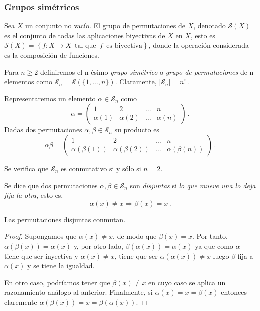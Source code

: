 \subsubsection{Grupos simétricos}

Sea $X$ un conjunto no vacío. El grupo de permutaciones de $X$, denotado $\mathcal S(X)$ es el conjunto de todas las aplicaciones biyectivas de $X$ en $X$, esto es $\mathcal S(X) = \left\{f:X \rightarrow X \, \text{ tal que } \, f \, \text{ es biyectiva}\right\}$, donde la operación considerada es la composición de funciones.

Para $n \ge 2$ definiremos el n-ésimo \textit{grupo simétrico} o \textit{grupo de permutaciones} de n elementos como $\mathcal S_n = \mathcal S(\{1,\hdots,n\})$. Claramente, $|\mathcal S_n| = n!$\,.

Representaremos un elemento $\alpha \in \mathcal S_n$ como \begin{equation*}
  \alpha = \begin{pmatrix}
    1 & 2 & \hdots & n \\
    \alpha(1) & \alpha(2) & \hdots & \alpha(n) 
  \end{pmatrix}\,.
\end{equation*}
Dadas dos permutaciones $\alpha,\beta \in \mathcal S_n$ su producto es \begin{equation*}
  \alpha \beta = \begin{pmatrix}
    1 & 2 & \hdots & n \\
    \alpha(\beta(1)) & \alpha(\beta(2)) & \hdots & \alpha(\beta(n))
  \end{pmatrix}\,.
\end{equation*}

Se verifica que $\mathcal S_n$ es conmutativo si y sólo si $n=2$.

\begin{ndef}
Se dice que dos permutaciones $\alpha,\beta \in \mathcal S_n$ son \textit{disjuntas} si \textit{lo que mueve una lo deja fija la otra}, esto es, \begin{equation*}
  \alpha(x) \neq x \Rightarrow \beta(x) = x\,.
\end{equation*}
\end{ndef}

\begin{nprop} 
Las permutaciones disjuntas conmutan.
\end{nprop}
\begin{proof}
Supongamos que $	\alpha(x) \neq x$, de modo que $\beta(x) = x$. Por tanto, $\alpha(\beta(x)) = \alpha(x)$ y, por otro lado, $\beta(\alpha(x)) = \alpha(x)$ ya que como $\alpha$ tiene que ser inyectiva y $\alpha(x) \neq x$, tiene que ser $\alpha(\alpha(x)) \neq x$ luego $\beta$ fija a $\alpha(x)$ y se tiene la igualdad.

En otro caso, podríamos tener que $\beta(x) \neq x$ en cuyo caso se aplica un razonamiento análogo al anterior. Finalmente, si $\alpha(x) = x = \beta(x)$ entonces claremente $\alpha(\beta(x)) = x = \beta(\alpha(x))$.
\end{proof}

